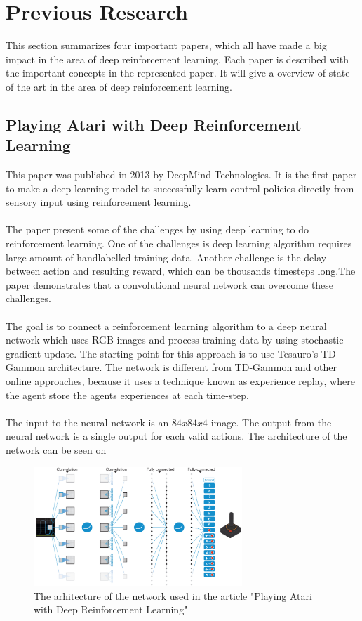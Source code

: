 \section{Previous Research}
\label{Previous_Research}
This section summarizes four important papers, which all have made a big impact in the area of deep reinforcement learning. Each paper is described with the important concepts in the represented paper. It will give a overview of state of the art in the area of deep reinforcement learning.   

\subsection{Playing Atari with Deep Reinforcement Learning }\cite{DBLP:journals/corr/MnihKSGAWR13}
This paper was published in 2013 by DeepMind Technologies. It is the first paper to make a deep learning model to successfully learn control policies directly from sensory input using reinforcement learning. \\
\\
The paper present some of the challenges by using deep learning to do reinforcement learning. One of the challenges is deep learning algorithm requires large amount of handlabelled training data. Another challenge is the delay between action and resulting reward, which can be thousands timesteps long.The paper demonstrates that a convolutional neural network can overcome these challenges. \\
\\
The goal is to connect a reinforcement learning algorithm to a deep neural network which uses RGB images and process training data by using stochastic gradient update. The starting point for this approach is to use Tesauro's TD-Gammon \cite{Tesauro:1995:TDL:203330.203343} architecture. The network is different from TD-Gammon and other online approaches, because it uses a technique known as experience replay, where the agent store the agents experiences at each time-step.\\
\\
The input to the neural network is an $84 x 84 x 4$ image. The output from the neural network is a single output for each valid actions. The architecture of the network can be seen on    
\begin{figure}[H]
	\centering
	\includegraphics[width=0.7\textwidth]{Figures/TheoreticalBackground/playing_atari.jpg}
	\caption{The arhitecture of the network used in the article "Playing Atari with Deep Reinforcement Learning"}
	\label{fig:playing_atari}
\end{figure} 


